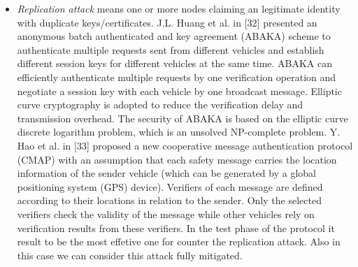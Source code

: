 \begin{itemize}
        \item \textit{Replication attack} means one or more nodes claiming an legitimate identity with duplicate keys/certificates.
        J.L. Huang et al. in [32] presented an anonymous batch authenticated and key agreement (ABAKA) scheme to authenticate multiple requests sent from different vehicles and establish different session keys for different vehicles at the same time. ABAKA can efficiently authenticate multiple requests by one verification operation and negotiate a session key with each vehicle by one broadcast message. Elliptic curve cryptography is adopted to reduce the verification delay and transmission overhead. The security of ABAKA is based on the elliptic curve discrete logarithm problem, which is an unsolved NP-complete problem.
        \newline
        Y. Hao et al. in [33] proposed a new cooperative message authentication protocol (CMAP) with an assumption that each safety message carries the location information of the sender vehicle (which can be generated by a global positioning system (GPS) device). Verifiers of each message are defined according to their locations in relation to the sender. Only the selected verifiers check the validity of the message while other vehicles rely on verification results from these verifiers. In the test phase of the protocol it result to be the most effetive one for counter the replication attack.
        \newline 
        Also in this case  we can consider this attack fully mitigated. 
    \end{itemize}
    
